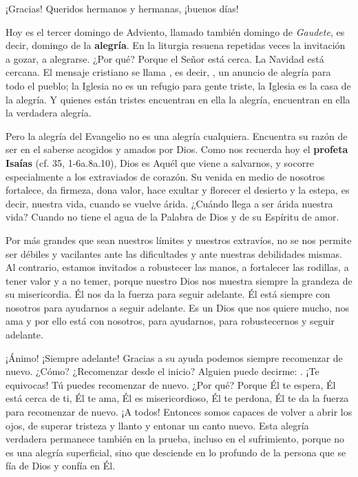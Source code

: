 				\begin{body}
					¡Gracias! Queridos hermanos y hermanas, ¡buenos días!
					
					Hoy es el tercer domingo de Adviento, llamado también domingo de \emph{Gaudete}, es decir, domingo de la \textbf{alegría}. En la liturgia resuena repetidas veces la invitación a gozar, a alegrarse. ¿Por qué? Porque el Señor está cerca. La Navidad está cercana. El mensaje cristiano se llama , es decir, , un anuncio de alegría para todo el pueblo; la Iglesia no es un refugio para gente triste, la Iglesia es la casa de la alegría. Y quienes están tristes encuentran en ella la alegría, encuentran en ella la verdadera alegría.
					
					Pero la alegría del Evangelio no es una alegría cualquiera. Encuentra su razón de ser en el saberse acogidos y amados por Dios. Como nos recuerda hoy el \textbf{profeta Isaías} (cf. 35, 1-6a.8a.10), Dios es Aquél que viene a salvarnos, y socorre especialmente a los extraviados de corazón. Su venida en medio de nosotros fortalece, da firmeza, dona valor, hace exultar y florecer el desierto y la estepa, es decir, nuestra vida, cuando se vuelve árida. ¿Cuándo llega a ser árida nuestra vida? Cuando no tiene el agua de la Palabra de Dios y de su Espíritu de amor.
					
					Por más grandes que sean nuestros límites y nuestros extravíos, no se nos permite ser débiles y vacilantes ante las dificultades y ante nuestras debilidades mismas. Al contrario, estamos invitados a robustecer las manos, a fortalecer las rodillas, a tener valor y a no temer, porque nuestro Dios nos muestra siempre la grandeza de su misericordia. Él nos da la fuerza para seguir adelante. Él está siempre con nosotros para ayudarnos a seguir adelante. Es un Dios que nos quiere mucho, nos ama y por ello está con nosotros, para ayudarnos, para robustecernos y seguir adelante.
					
					¡Ánimo! ¡Siempre adelante! Gracias a su ayuda podemos siempre recomenzar de nuevo. ¿Cómo? ¿Recomenzar desde el inicio? Alguien puede decirme: . ¡Te equivocas! Tú puedes recomenzar de nuevo. ¿Por qué? Porque Él te espera, Él está cerca de ti, Él te ama, Él es misericordioso, Él te perdona, Él te da la fuerza para recomenzar de nuevo. ¡A todos! Entonces somos capaces de volver a abrir los ojos, de superar tristeza y llanto y entonar un canto nuevo. Esta alegría verdadera permanece también en la prueba, incluso en el sufrimiento, porque no es una alegría superficial, sino que desciende en lo profundo de la persona que se fía de Dios y confía en Él.
					

\end{body}
